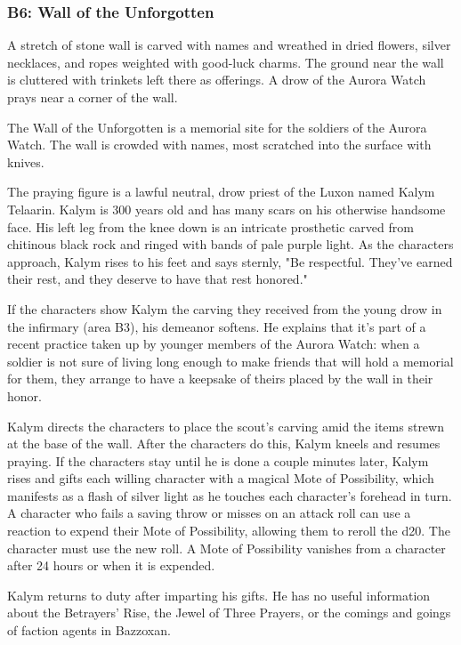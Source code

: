 \documentclass[10pt,a4paper,twoside,twocolumn,openany,nodeprecatedcode]{dndbook}
\begin{document}
\subsubsection{B6: Wall of the Unforgotten}
\begin{DndReadAloud}{}
A stretch of stone wall is carved with names and wreathed in dried flowers, silver necklaces, and ropes weighted with good-luck charms. The ground near the wall is cluttered with trinkets left there as offerings. A drow of the Aurora Watch prays near a corner of the wall.

\end{DndReadAloud}

The Wall of the Unforgotten is a memorial site for the soldiers of the Aurora Watch. The wall is crowded with names, most scratched into the surface with knives.

The praying figure is a lawful neutral, drow priest of the Luxon named Kalym Telaarin. Kalym is 300 years old and has many scars on his otherwise handsome face. His left leg from the knee down is an intricate prosthetic carved from chitinous black rock and ringed with bands of pale purple light. As the characters approach, Kalym rises to his feet and says sternly, "Be respectful. They've earned their rest, and they deserve to have that rest honored."

If the characters show Kalym the carving they received from the young drow in the infirmary (area B3), his demeanor softens. He explains that it's part of a recent practice taken up by younger members of the Aurora Watch: when a soldier is not sure of living long enough to make friends that will hold a memorial for them, they arrange to have a keepsake of theirs placed by the wall in their honor.

Kalym directs the characters to place the scout's carving amid the items strewn at the base of the wall. After the characters do this, Kalym kneels and resumes praying. If the characters stay until he is done a couple minutes later, Kalym rises and gifts each willing character with a magical Mote of Possibility, which manifests as a flash of silver light as he touches each character's forehead in turn. A character who fails a saving throw or misses on an attack roll can use a reaction to expend their Mote of Possibility, allowing them to reroll the d20. The character must use the new roll. A Mote of Possibility vanishes from a character after 24 hours or when it is expended.

Kalym returns to duty after imparting his gifts. He has no useful information about the Betrayers' Rise, the Jewel of Three Prayers, or the comings and goings of faction agents in Bazzoxan.
\end{document}
